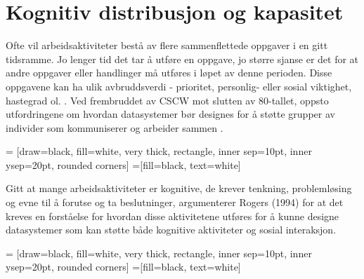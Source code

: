 \section{Kognitiv distribusjon og kapasitet}
\label{chp: kognisjon}

Ofte vil arbeidsaktiviteter bestå av flere sammenflettede oppgaver i en gitt tidsramme. Jo lenger tid det tar å utføre en oppgave, jo større sjanse er det for at andre oppgaver eller handlinger må utføres i løpet av denne perioden. Disse oppgavene kan ha ulik avbruddsverdi - prioritet, personlig- eller sosial viktighet, hastegrad ol. \cite{Rogers94}. 
Ved frembruddet av CSCW mot slutten av 80-tallet, oppsto utfordringene om hvordan datasystemer bør designes for å støtte grupper av individer som kommuniserer og arbeider sammen \cite{Rogers94}. 

 = [draw=black, fill=white, very thick,
    rectangle, inner sep=10pt, inner ysep=20pt, rounded corners]
 =[fill=black, text=white]
%


\noindent
Gitt at mange arbeidsaktiviteter er kognitive, de krever tenkning, problemløsing og evne til å forutse og ta beslutninger, argumenterer Rogers (1994) for at det kreves en forståelse for hvordan disse aktivitetene utføres for å kunne designe datasystemer som kan støtte både kognitive aktiviteter og sosial interaksjon.

 = [draw=black, fill=white, very thick,
    rectangle, inner sep=10pt, inner ysep=20pt, rounded corners]
 =[fill=black, text=white]
%

